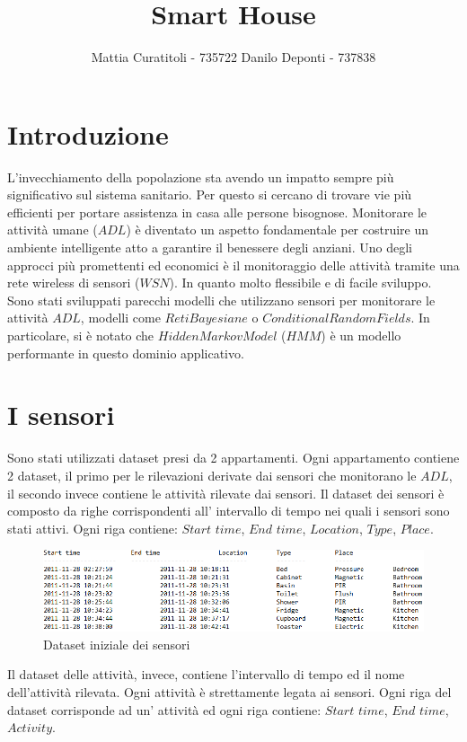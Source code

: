 \documentclass[11pt, a4paper]{scrartcl}
\title{\textbf{Smart House}}
\author{Mattia Curatitoli - 735722  Danilo Deponti - 737838} \date{}
\begin{document}
\maketitle
 
\section*{Introduzione}
L'invecchiamento della popolazione sta avendo un impatto sempre più significativo sul sistema sanitario. Per questo si cercano di trovare vie più efficienti per portare assistenza in casa alle persone bisognose.
Monitorare le attività umane ($ADL$) è diventato un aspetto fondamentale per costruire un ambiente intelligente atto a garantire il benessere degli anziani.
Uno degli approcci più promettenti ed economici è il monitoraggio delle attività tramite una rete wireless di sensori ($WSN$). In quanto molto flessibile e di facile sviluppo.
Sono stati sviluppati parecchi modelli che utilizzano sensori per monitorare le attività $ADL$, modelli come $Reti Bayesiane$ o $Conditional Random Fields$. In particolare, si è notato che $Hidden Markov Model$ ($HMM$) è un modello performante in questo dominio applicativo.
\section*{I sensori}
Sono stati utilizzati dataset presi da 2 appartamenti. Ogni appartamento contiene 2 dataset, il primo per le rilevazioni derivate dai sensori che monitorano le $ADL$, il secondo invece contiene le attività rilevate dai sensori.
Il dataset dei sensori è composto da righe corrispondenti all' intervallo di tempo nei quali i sensori sono stati attivi. Ogni riga contiene: $Start$ $time$, $End$ $time$, $Location$, $Type$, $Place$.
\begin{figure}[!ht]
\centering
 \includegraphics[scale=0.7]{Sensor.png} 
 \caption{Dataset iniziale dei sensori}
\label{fig:magn}
\end{figure}

Il dataset delle attività, invece, contiene l'intervallo di tempo ed il nome dell'attività rilevata.
Ogni attività è strettamente legata ai sensori. Ogni riga del dataset corrisponde ad un' attività ed ogni riga contiene: $Start$ $time$, $End$ $time$, $Activity$.
\end{document}
